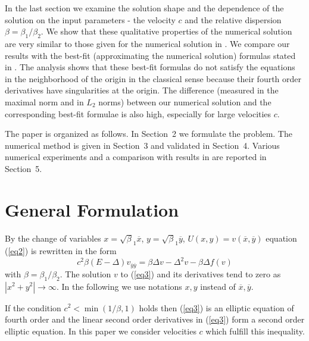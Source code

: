 \documentclass[preprint]{elsarticle}
\newcommand{\rf}[1]{(\ref{#1})}
\begin{document}
In the last section we examine the solution shape and the dependence of the solution on the input  parameters - the velocity $c$ and the relative dispersion $\beta =\beta_1  / \beta_2$. We show that these  qualitative properties of the numerical solution are very similar to those given for the  numerical solution in \cite{Ch2011,Ch2012}. 
We compare our results with the best-fit  (approximating the numerical solution)  formulas stated in \cite{Ch2011}.   
The analysis  shows that  these best-fit formulas do not satisfy the equations in the neighborhood of the origin in the classical sense because their fourth order derivatives have singularities at the origin.  The  difference (measured in the maximal norm and in $L_2$ norms)  between our numerical solution and the corresponding best-fit formulae is also high, especially  for large velocities $c$. 

The paper is organized as follows. In Section~2 we formulate the  problem. The numerical method is given in Section~3 and validated in Section~4.  Various numerical  experiments and a comparison with  results in \cite{Ch2011,Ch2012} are reported in Section~5.

\section{General Formulation}

By the change of variables $x=\sqrt\beta_1 { \overline x}$, $y=\sqrt\beta_1 { \overline y}$, $U(x,y)= v({ \overline x},{ \overline y} )$ 
 equation \rf{eq2} is rewritten in the form 
 \begin{equation}\label{eq3}
c^2 \beta (E- \Delta) v_{{\overline y}{\overline y}} = \beta \Delta v - \Delta^2 v - \beta \Delta f(v)
\end{equation}
with   $\beta = \beta_1 / \beta_2$.
The solution $v$ to \rf{eq3} and its derivatives  tend to zero as $|x^2 +y^2|\rightarrow \infty$.
In the following we use notations $x,y$ instead of ${\overline x},{\overline y}$.

If the condition $c^2 < \min (1/ \beta,1)$ holds then  \rf{eq3} is an elliptic equation of fourth order and the linear second order derivatives in \rf{eq3} form  a second order elliptic equation. In this paper we consider velocities $c$ which fulfill this inequality.
\end{document}
